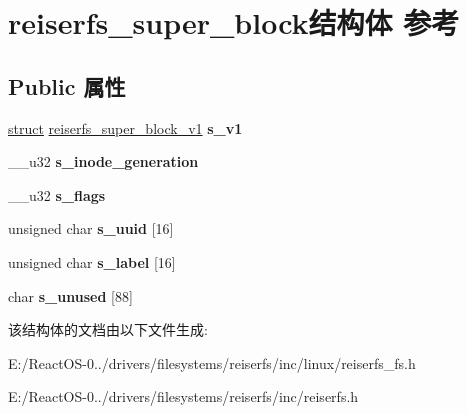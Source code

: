 \hypertarget{structreiserfs__super__block}{}\section{reiserfs\+\_\+super\+\_\+block结构体 参考}
\label{structreiserfs__super__block}
\subsection*{Public 属性}
\begin{DoxyCompactItemize}
\item 
\mbox{\label{structreiserfs__super__block_acfa5d550002c418f39fec8661c2607bc}} 
\hyperlink{interfacestruct}{struct} \hyperlink{structreiserfs__super__block__v1}{reiserfs\+\_\+super\+\_\+block\+\_\+v1} {\bfseries s\+\_\+v1}
\item 
\mbox{\label{structreiserfs__super__block_ade8bee94f8930332c582e423f7bdd72c}} 
\+\_\+\+\_\+u32 {\bfseries s\+\_\+inode\+\_\+generation}
\item 
\mbox{\label{structreiserfs__super__block_a4beecf935e137f092c3477e8f572a244}} 
\+\_\+\+\_\+u32 {\bfseries s\+\_\+flags}
\item 
\mbox{\label{structreiserfs__super__block_a3b44249ed9cfa5760478ec4e41d4170f}} 
unsigned char {\bfseries s\+\_\+uuid} \mbox{[}16\mbox{]}
\item 
\mbox{\label{structreiserfs__super__block_a0839fb9aa9ed2f521ad52c8cee618d57}} 
unsigned char {\bfseries s\+\_\+label} \mbox{[}16\mbox{]}
\item 
\mbox{\label{structreiserfs__super__block_a9011ffd3f6fbb6baa630b8952b50b637}} 
char {\bfseries s\+\_\+unused} \mbox{[}88\mbox{]}
\end{DoxyCompactItemize}


该结构体的文档由以下文件生成\+:\begin{DoxyCompactItemize}
\item 
E\+:/\+React\+O\+S-\/0../drivers/filesystems/reiserfs/inc/linux/reiserfs\+\_\+fs.\+h\item 
E\+:/\+React\+O\+S-\/0../drivers/filesystems/reiserfs/inc/reiserfs.\+h\end{DoxyCompactItemize}
